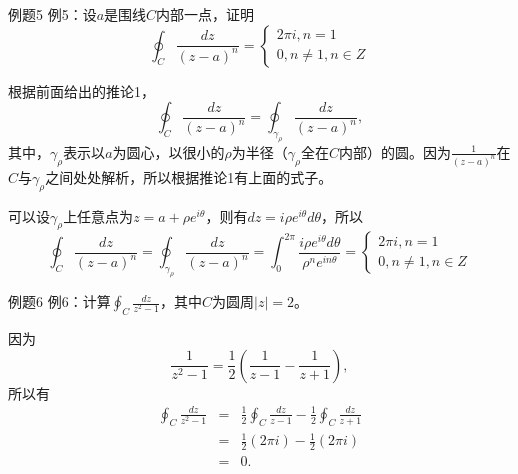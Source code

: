 \documentclass[11pt]{beamer}
\begin{document}
\begin{frame}{例题5}
例5：设$a$是围线$C$内部一点，证明
\begin{equation}
\oint_C \frac{dz}{(z-a)^n} = \left\{
\begin{aligned}
2 \pi i, n=1 \\
0, n \neq 1, n\in Z
\end{aligned}
\right.
\end{equation}

根据前面给出的推论1，
\begin{equation}
\oint_C \frac{dz}{(z-a)^n} = \oint_{\gamma_\rho} \frac{dz}{(z-a)^n},
\end{equation}
其中，$\gamma_\rho$表示以$a$为圆心，以很小的$\rho$为半径（$\gamma_\rho$全在$C$内部）的圆。因为$\frac{1}{(z-a)^n}$在$C$与$\gamma_\rho$之间处处解析，所以根据推论1有上面的式子。

可以设$\gamma_\rho$上任意点为$z = a + \rho e^{i\theta}$，则有$dz = i \rho e^{i\theta} d \theta$，所以
\begin{equation}
\oint_C \frac{dz}{(z-a)^n} = \oint_{\gamma_\rho} \frac{dz}{(z-a)^n} = \int^{2\pi}_0 \frac{i \rho e^{i\theta} d \theta}{\rho^n e^{in \theta}}
= \left\{
\begin{aligned}
2 \pi i, n=1 \\
0, n \neq 1, n\in Z
\end{aligned}
\right.
\end{equation}

\end{frame}

\begin{frame}{例题6}
例6：计算$\oint_C \frac{dz}{z^2 -1}$，其中$C$为圆周$|z|=2$。

因为
\begin{equation}
\frac{1}{z^2 -1} = \frac{1}{2}( \frac{1}{z-1} - \frac{1}{z+1} ),
\end{equation}
所以有
\begin{eqnarray}
\oint_C \frac{dz}{z^2 -1} &=& \frac{1}{2}\oint_C \frac{dz}{z-1} - \frac{1}{2} \oint_C \frac{dz}{z+1}
\nonumber\\
&=& \frac{1}{2}(2\pi i) - \frac{1}{2}(2\pi i)
\nonumber\\
&=& 0.
\end{eqnarray}
\end{frame}
\end{document}
